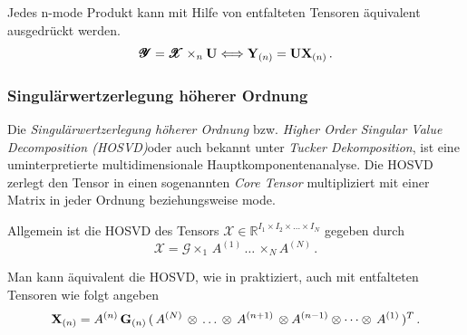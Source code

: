 \begin{Bemerkung}
Jedes n-mode Produkt kann mit Hilfe von entfalteten Tensoren äquivalent ausgedrückt werden.
\begin{equation}
\pmb{\mathscr{Y}} = \pmb{\mathscr{X}} \times_n \bold{U} \Longleftrightarrow \bold{Y}_{(n)} = \bold{U} \bold{X}_{(n)} \, .
\end{equation}
\end{Bemerkung}

\subsubsection{Singulärwertzerlegung höherer Ordnung}

Die \textit{Singulärwertzerlegung höherer Ordnung} bzw. \textit{Higher Order Singular Value Decomposition (HOSVD)}oder auch bekannt unter \textit{Tucker Dekomposition}, ist eine uminterpretierte multidimensionale Hauptkomponentenanalyse.
Die HOSVD zerlegt den Tensor in einen sogenannten \textit{Core Tensor} multipliziert mit einer Matrix in jeder Ordnung beziehungsweise mode. 

Allgemein ist die HOSVD des Tensors $\pmb{\mathscr{X}}  \in \mathbb{R}^{I_1 \times I_2 \times \dots \times I_N}$ gegeben durch
\begin{equation}
\pmb{\mathscr{X}}= \pmb{\mathscr{G}} \times_1 \, A^{(1)} \, \dots \, \times_N A^{(N)} \, .
\end{equation}

Man kann äquivalent die HOSVD, wie in  \cite[462]{Kolda} praktiziert, auch mit entfalteten Tensoren wie folgt angeben
\begin{equation} \label{eq:tensortensor}
\bold{X}_{(n)} = A^{(n)} \, \bold{G}_{(n)} \, ( \, A^{(N)} \, \otimes  \, \dots \, \otimes \, A^{(n+1)} \, \otimes A^{(n-1)} \otimes \dots \otimes \, A^{(1)} \, )^{T} \, .
\end{equation}


